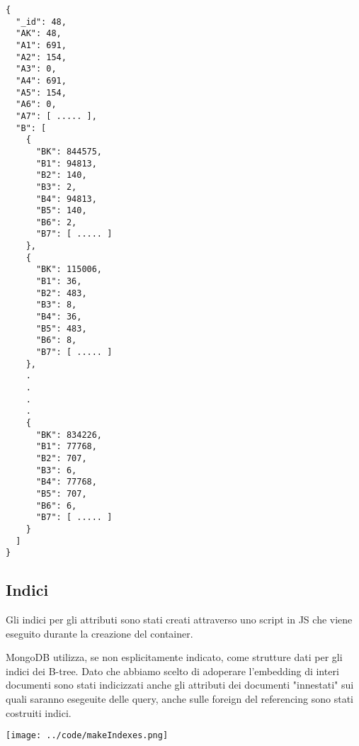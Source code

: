 \begin{Verbatim}[frame=single,framesep=2mm,label= Embedding di B in A,labelposition=all]
{
  "_id": 48,
  "AK": 48,
  "A1": 691,
  "A2": 154,
  "A3": 0,
  "A4": 691,
  "A5": 154,
  "A6": 0,
  "A7": [ ..... ],
  "B": [
    {
      "BK": 844575,
      "B1": 94813,
      "B2": 140,
      "B3": 2,
      "B4": 94813,
      "B5": 140,
      "B6": 2,
      "B7": [ ..... ]
    },
    {
      "BK": 115006,
      "B1": 36,
      "B2": 483,
      "B3": 8,
      "B4": 36,
      "B5": 483,
      "B6": 8,
      "B7": [ ..... ]
    },
    .
    .
    .
    .
    {
      "BK": 834226,
      "B1": 77768,
      "B2": 707,
      "B3": 6,
      "B4": 77768,
      "B5": 707,
      "B6": 6,
      "B7": [ ..... ]
    }
  ]
}
\end{Verbatim}
\subsection{Indici}

Gli indici per gli attributi sono stati creati attraverso uno script in JS che viene eseguito durante la creazione del container.

MongoDB utilizza, se non esplicitamente indicato, come strutture dati per gli indici dei B-tree. Dato che abbiamo scelto di adoperare l'embedding di interi documenti sono stati 
indicizzati anche gli attributi dei documenti "innestati" sui quali saranno esegeuite delle query, anche sulle foreign del referencing sono stati costruiti indici.

\begin{center}
  \texttt{[image: ../code/makeIndexes.png]}
\end{center}

